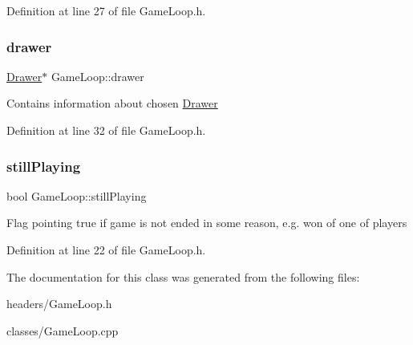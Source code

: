 Definition at line 27 of file Game\+Loop.\+h.

\mbox{\label{classGameLoop_a9f25ffc0e91f10c6030ca6b05032f71f}} 
\subsubsection{\texorpdfstring{drawer}{drawer}}
{\footnotesize\ttfamily \hyperlink{classDrawer}{Drawer}$\ast$ Game\+Loop\+::drawer\hspace{0.3cm}{\ttfamily [private]}}

Contains information about chosen \hyperlink{classDrawer}{Drawer} 

Definition at line 32 of file Game\+Loop.\+h.

\mbox{\label{classGameLoop_a74bff510eaf3cab91599f164dfa903cf}} 
\subsubsection{\texorpdfstring{still\+Playing}{stillPlaying}}
{\footnotesize\ttfamily bool Game\+Loop\+::still\+Playing\hspace{0.3cm}{\ttfamily [private]}}

Flag pointing true if game is not ended in some reason, e.\+g. won of one of players 

Definition at line 22 of file Game\+Loop.\+h.



The documentation for this class was generated from the following files\+:\begin{DoxyCompactItemize}
\item 
headers/Game\+Loop.\+h\item 
classes/Game\+Loop.\+cpp\end{DoxyCompactItemize}
